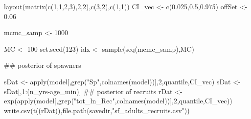 \documentclass[
  11pt,
]{article}
\newenvironment{Shaded}{}{}
\newcommand{\CommentTok}[1]{\textcolor[rgb]{0.00,0.50,0.00}{#1}}
\newcommand{\DecValTok}[1]{#1}
\newcommand{\FloatTok}[1]{#1}
\newcommand{\KeywordTok}[1]{\textcolor[rgb]{0.00,0.00,1.00}{#1}}
\newcommand{\NormalTok}[1]{#1}
\newcommand{\OperatorTok}[1]{#1}
\newcommand{\StringTok}[1]{\textcolor[rgb]{0.00,0.50,0.50}{#1}}
\begin{document}
\begin{Shaded}
\begin{Highlighting}[]
\KeywordTok{layout}\NormalTok{(}\KeywordTok{matrix}\NormalTok{(}\KeywordTok{c}\NormalTok{(}\DecValTok{1}\NormalTok{,}\DecValTok{1}\NormalTok{,}\DecValTok{2}\NormalTok{,}\DecValTok{3}\NormalTok{),}\DecValTok{2}\NormalTok{,}\DecValTok{2}\NormalTok{),}\KeywordTok{c}\NormalTok{(}\DecValTok{3}\NormalTok{,}\DecValTok{2}\NormalTok{),}\KeywordTok{c}\NormalTok{(}\DecValTok{1}\NormalTok{,}\DecValTok{1}\NormalTok{))}
\NormalTok{CI_vec <-}\StringTok{ }\KeywordTok{c}\NormalTok{(}\FloatTok{0.025}\NormalTok{,}\FloatTok{0.5}\NormalTok{,}\FloatTok{0.975}\NormalTok{)}
\NormalTok{offSet <-}\StringTok{ }\FloatTok{0.06}

\NormalTok{mcmc_samp <-}\StringTok{ }\DecValTok{1000}

\NormalTok{MC <-}\StringTok{ }\DecValTok{100}
\KeywordTok{set.seed}\NormalTok{(}\DecValTok{123}\NormalTok{)}
\NormalTok{idx <-}\StringTok{ }\KeywordTok{sample}\NormalTok{(}\KeywordTok{seq}\NormalTok{(mcmc_samp),MC)}

\CommentTok{## posterior of spawners}

\NormalTok{sDat <-}\StringTok{ }\KeywordTok{apply}\NormalTok{(model[,}\KeywordTok{grep}\NormalTok{(}\StringTok{"Sp"}\NormalTok{,}\KeywordTok{colnames}\NormalTok{(model))],}\DecValTok{2}\NormalTok{,quantile,CI_vec)}
\NormalTok{sDat <-}\StringTok{ }\NormalTok{sDat[,}\DecValTok{1}\OperatorTok{:}\NormalTok{(n_yrs}\OperatorTok{-}\NormalTok{age_min)]}
\CommentTok{## posterior of recruits}
\NormalTok{rDat <-}\StringTok{ }\KeywordTok{exp}\NormalTok{(}\KeywordTok{apply}\NormalTok{(model[,}\KeywordTok{grep}\NormalTok{(}\StringTok{"tot_ln_Rec"}\NormalTok{,}\KeywordTok{colnames}\NormalTok{(model))],}\DecValTok{2}\NormalTok{,quantile,CI_vec))}
\KeywordTok{write.csv}\NormalTok{(}\KeywordTok{t}\NormalTok{((rDat)),}\KeywordTok{file.path}\NormalTok{(savedir,}\StringTok{"sf_adults_recruits.csv"}\NormalTok{))}


\end{Highlighting}
\end{Shaded}
\end{document}
